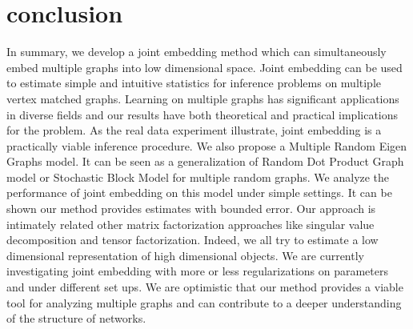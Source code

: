 \documentclass[10pt,journal,compsoc]{IEEEtran}
\begin{document}
\section{conclusion}
In summary, we develop a joint embedding method which can simultaneously embed multiple graphs into low dimensional space. Joint embedding can
be used to estimate simple and intuitive statistics for inference problems on multiple vertex matched graphs. Learning on multiple graphs has significant applications in diverse fields and our results have both theoretical and practical implications for the problem. As the real data experiment illustrate, joint embedding is a practically viable inference procedure. We also propose a Multiple Random Eigen Graphs model. It can be seen as a generalization of Random Dot Product Graph model or Stochastic Block Model for multiple random graphs. We analyze the performance of joint embedding on this model under simple settings. It can be shown our method provides estimates with bounded error. Our approach is intimately related other matrix factorization approaches like singular value decomposition and tensor factorization. Indeed, we all try to estimate a low dimensional representation of high dimensional objects. We are currently investigating joint embedding with more or less regularizations on parameters and under different set ups. We are optimistic that our method provides a viable tool for analyzing multiple graphs and can contribute to a deeper understanding of the structure of networks.


\end{document}
